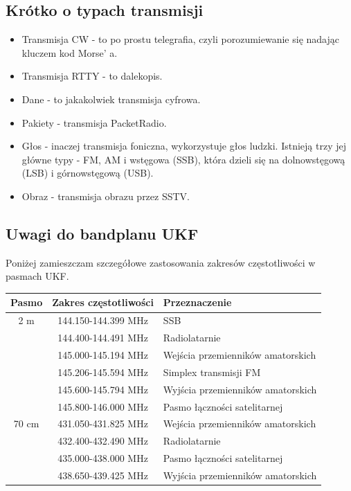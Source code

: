 \documentclass[a4paper,11pt]{article}
\begin{document}
\subsection{Krótko o typach transmisji}
\begin{itemize}
\item Transmisja CW - to po prostu telegrafia, czyli porozumiewanie się nadając kluczem kod Morse' a.
\item Transmisja RTTY - to dalekopis.
\item Dane - to jakakolwiek transmisja cyfrowa.
\item Pakiety - transmisja PacketRadio.
\item Głos - inaczej transmisja foniczna, wykorzystuje głos ludzki. Istnieją trzy jej główne typy - FM, AM i wstęgowa (SSB), która dzieli się na dolnowstęgową (LSB) i górnowstęgową (USB).
\item Obraz - transmisja obrazu przez SSTV.
\end{itemize}
\subsection{Uwagi do bandplanu UKF}
Poniżej zamieszczam szczegółowe zastosowania zakresów częstotliwości w pasmach UKF.
\begin{center}
\begin{tabular}{| c | c | p{8cm} |}
\hline
\textbf{Pasmo} & \textbf{Zakres częstotliwości} & \textbf{Przeznaczenie} \\ \hline
2 m & 144.150-144.399 MHz & SSB \\ \cline{2-3}
 & 144.400-144.491 MHz & Radiolatarnie \\ \cline{2-3}
 & 145.000-145.194 MHz & Wejścia przemienników amatorskich \\ \cline{2-3}
 & 145.206-145.594 MHz & Simplex transmisji FM \\ \cline{2-3}
 & 145.600-145.794 MHz & Wyjścia przemienników amatorskich \\ \cline{2-3}
 & 145.800-146.000 MHz & Pasmo łączności satelitarnej \\ \hline
70 cm & 431.050-431.825 MHz & Wejścia przemienników amatorskich \\ \cline{2-3}
 & 432.400-432.490 MHz & Radiolatarnie \\ \cline{2-3}
 & 435.000-438.000 MHz & Pasmo łączności satelitarnej \\ \cline{2-3}
 & 438.650-439.425 MHz & Wyjścia przemienników amatorskich \\ \hline
\end{tabular}
\end{center}
\end{document}
